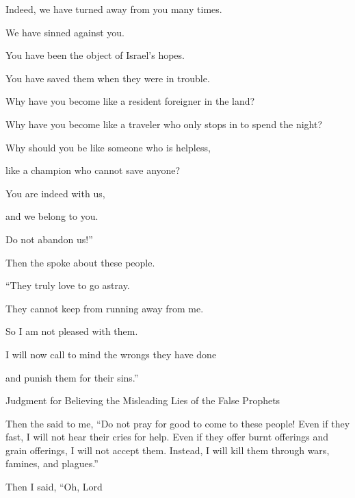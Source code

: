 {\par }{\Q Indeed,
we have turned away
from you many times.
\par }{\Q We have sinned against you.
\par }{\Q {}You have been the object of Israel’s
hopes.
\par }{\Q You have saved
them when
they were in trouble.
\par }{\Q Why
have you become
like a resident foreigner
in the land?
\par }{\Q Why have you become like a traveler
who only stops
in to spend the night?
\par }{\Q {}Why
should you be
like someone
who is helpless,
\par }{\Q like a champion
who cannot
save
anyone?
\par }{\Q You
are indeed with us,
\par }{\Q and we belong to you.
\par }{\Q Do not
abandon us!”
\par }{\PP {}Then
the {}
spoke
about these
people.
\par }{\Q “They truly
love
to go astray.
\par }{\Q They cannot
keep
from running
away
from me.

\par }{\Q So I
am not
pleased
with them.
\par }{\Q I will now
call to mind
the wrongs
they have done

\par }{\Q and punish
them for their sins.”
\par }{\SH Judgment for Believing the Misleading Lies of the False Prophets
\par }{\PP {}Then the
{}
said to me, “Do not
pray
for
good
to come to these
people!
Even if
they fast,
I will not
hear
their cries
for
help. Even if
they offer
burnt offerings
and grain offerings,
I will not
accept
them. Instead,
I
will kill them through wars,
famines,
and plagues.”
\par }{\PP {}Then I said,
“Oh,
Lord

}
